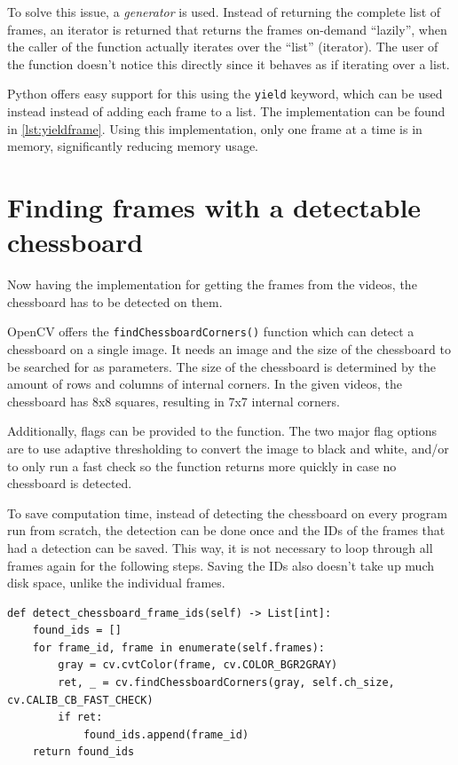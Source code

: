 To solve this issue, a \emph{generator} is used. Instead of returning the complete list of frames, an iterator is returned that returns the frames on-demand \enquote{lazily}, when the caller of the function actually iterates over the \enquote{list} (iterator). \cite{python_generator} The user of the function doesn't notice this directly since it behaves as if iterating over a list.

Python offers easy support for this using the \texttt{yield} keyword, which can be used instead instead of adding each frame to a list. The implementation can be found in \autoref{lst:yieldframe}. Using this implementation, only one frame at a time is in memory, significantly reducing memory usage.

\section{Finding frames with a detectable chessboard}
Now having the implementation for getting the frames from the videos, the chessboard has to be detected on them.

OpenCV offers the \texttt{findChessboardCorners()} function which can detect a chessboard on a single image. It needs an image and the size of the chessboard to be searched for as parameters. \cite{cv_cctut} The size of the chessboard is determined by the amount of rows and columns of internal corners. In the given videos, the chessboard has 8x8 squares, resulting in 7x7 internal corners.

Additionally, flags can be provided to the function. The two major flag options are to use adaptive thresholding to convert the image to black and white, and/or to only run a fast check so the function returns more quickly in case no chessboard is detected.

To save computation time, instead of detecting the chessboard on every program run from scratch, the detection can be done once and the IDs of the frames that had a detection can be saved. This way, it is not necessary to loop through all frames again for the following steps. Saving the IDs also doesn't take up much disk space, unlike the individual frames.

\begin{lstlisting}[caption={Detecting chessboards}, label={lst:chessboard_detect}]
def detect_chessboard_frame_ids(self) -> List[int]:
    found_ids = []
    for frame_id, frame in enumerate(self.frames):
        gray = cv.cvtColor(frame, cv.COLOR_BGR2GRAY)
        ret, _ = cv.findChessboardCorners(gray, self.ch_size, cv.CALIB_CB_FAST_CHECK)
        if ret:
            found_ids.append(frame_id)
    return found_ids
\end{lstlisting}

